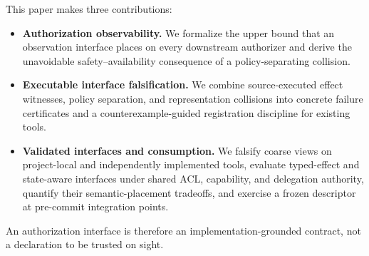 This paper makes three contributions:
\begin{itemize}[leftmargin=*]
  \item \textbf{Authorization observability.} We formalize the upper bound that
  an observation interface places on every downstream authorizer and derive the
  unavoidable safety--availability consequence of a policy-separating
  collision.
  \item \textbf{Executable interface falsification.} We combine source-executed
  effect witnesses, policy separation, and
  representation collisions into concrete failure certificates and a
  counterexample-guided registration discipline for existing tools.
  \item \textbf{Validated interfaces and consumption.} We falsify coarse views
  on project-local and independently implemented tools, evaluate typed-effect
  and state-aware interfaces under shared ACL, capability, and delegation
  authority, quantify their semantic-placement tradeoffs, and exercise a
  frozen descriptor at pre-commit integration points.
\end{itemize}

An authorization interface is therefore an implementation-grounded contract,
not a declaration to be trusted on sight.

